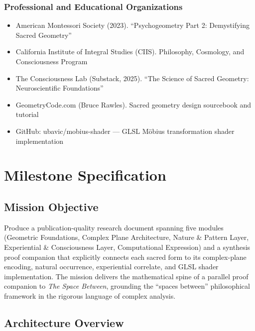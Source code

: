 \documentclass[11pt,letterpaper]{article}
\newcommand{\stageheader}[2]{%
  \noindent\colorbox{#2}{\makebox[\textwidth][l]{%
    \textcolor{white}{\bfseries\sffamily\hspace{6pt}#1\hspace{6pt}}}}%
  \vspace{0.5em}\par%
}
\begin{document}
\subsubsection{Professional and Educational Organizations}

\begin{itemize}[leftmargin=1.5em, itemsep=0.2em]
  \item American Montessori Society (2023). ``Psychogeometry Part 2: Demystifying Sacred Geometry''
  \item California Institute of Integral Studies (CIIS). Philosophy, Cosmology, and Consciousness Program
  \item The Consciousness Lab (Substack, 2025). ``The Science of Sacred Geometry: Neuroscientific Foundations''
  \item GeometryCode.com (Bruce Rawles). Sacred geometry design sourcebook and tutorial
  \item GitHub: ubavic/mobius-shader --- GLSL M\"{o}bius transformation shader implementation
\end{itemize}

\newpage
\stageheader{STAGE 3 --- MISSION PACKAGE}{tertiary}

\section{Milestone Specification}

\subsection{Mission Objective}

Produce a publication-quality research document spanning five modules (Geometric Foundations, Complex Plane Architecture, Nature \& Pattern Layer, Experiential \& Consciousness Layer, Computational Expression) and a synthesis proof companion that explicitly connects each sacred form to its complex-plane encoding, natural occurrence, experiential correlate, and GLSL shader implementation. The mission delivers the mathematical spine of a parallel proof companion to \textit{The Space Between}, grounding the ``spaces between'' philosophical framework in the rigorous language of complex analysis.

\subsection{Architecture Overview}
\end{document}
